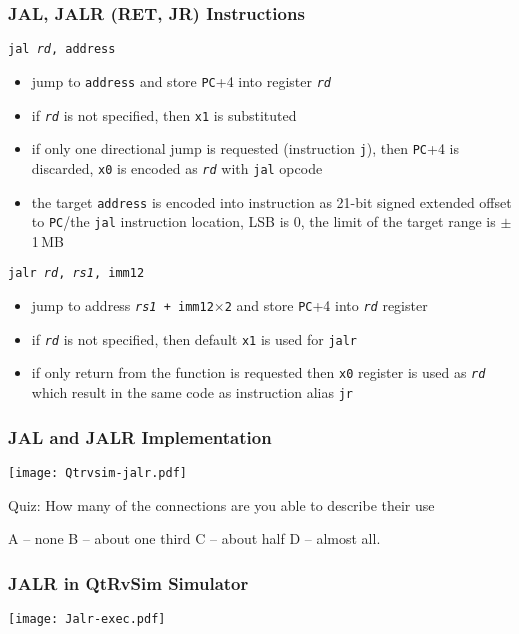 \documentclass{beamer}
\begin{document}
\begin{frame}
\frametitle{JAL, JALR (RET, JR) Instructions}

\texttt{jal \textit{rd}, address}
\begin{itemize}
 \item jump to \texttt{address} and store \texttt{PC}+4 into register \texttt{\textit{rd}} 
 \item if \texttt{\textit{rd}} is not specified, then \texttt{x1} is substituted
 \item if only one directional jump is requested (instruction \texttt{j}), then \texttt{PC}+4 is discarded, \texttt{x0} is encoded as \texttt{\textit{rd}} with \texttt{jal} opcode
 \item the target \texttt{address} is encoded into instruction  as 21-bit signed extended offset to \texttt{PC}/the \texttt{jal} instruction location, LSB is 0, the limit of the target range is $\pm$1\,MB
\end{itemize}

\texttt{jalr \textit{rd}, \textit{rs1}, imm12}
\begin{itemize}
 \item jump to address \texttt{\textit{rs1} + imm12$\times$2} and store \texttt{PC}+4 into \texttt{\textit{rd}} register 
 \item if \texttt{\textit{rd}} is not specified, then default \texttt{x1} is used for \texttt{jalr}
 \item if only return from the function is requested then \texttt{x0} register is used as \texttt{\textit{rd}} which result in the same code as instruction alias \texttt{jr}
\end{itemize}
\end{frame}


\begin{frame}
\frametitle{JAL and JALR Implementation}

\begin{center}
\texttt{[image: Qtrvsim-jalr.pdf]}
\end{center}

Quiz: How many of the connections are you able to describe their use

\phantom{Quiz: }A -- none B -- about one third  C -- about half D -- almost all.
\end{frame}


\begin{frame}
\frametitle{JALR in QtRvSim Simulator}

\begin{center}
\texttt{[image: Jalr-exec.pdf]}
\end{center}

\end{frame}
\end{document}
